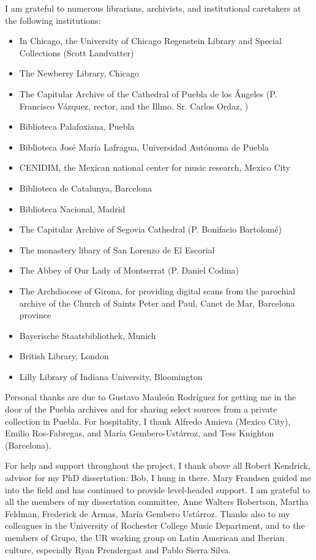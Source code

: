 I am grateful to numerous librarians, archivists, and institutional
caretakers at the following institutions:
\begin{itemize}
    \item In Chicago, the University of Chicago Regenstein Library and Special
        Collections (Scott Landvatter)
    \item The Newberry Library, Chicago
    \item The Capitular Archive of the Cathedral of Puebla de los Ángeles
        (P. Francisco Vázquez, rector, and the Illmo. Sr. Carlos
        Ordaz, )
    \item Biblioteca Palafoxiana, Puebla
    \item Biblioteca José María Lafragua, Universidad Autónoma de Puebla
    \item CENIDIM, the Mexican national center for music research, Mexico
        City
    \item Biblioteca de Catalunya, Barcelona
    \item Biblioteca Nacional, Madrid
    \item The Capitular Archive of Segovia Cathedral (P. Bonifacio Bartolomé)
    \item The monastery libary of San Lorenzo de El Escorial
    \item The Abbey of Our Lady of Montserrat (P. Daniel Codina)
    \item The Archdiocese of Girona, for providing digital scans from the
        parochial archive of the Church of Saints Peter and Paul, Canet de
        Mar, Barcelona province
    \item Bayerische Staatsbibliothek, Munich
    \item British Library, London
    \item Lilly Library of Indiana University, Bloomington
\end{itemize}
Personal thanks are due to Gustavo Mauleón Rodríguez for getting me in the
door of the Puebla archives and for sharing select sources from a private
collection in Puebla.
For hospitality, I thank Alfredo Amieva (Mexico City), Emilio Ros-Fabregas,
and María Gembero-Ustárroz, and Tess Knighton (Barcelona).

For help and support throughout the project, I thank above all Robert Kendrick,
advisor for my PhD dissertation: Bob, I hung in there. 
Mary Frandsen guided me into the field and has continued to provide
level-headed support.
I am grateful to all the members of my dissertation committee, Anne Walters
Robertson, Martha Feldman, Frederick de Armas, María Gembero Ustárroz.
Thanks also to my colleagues in the University of Rochester College Music
Department, and to the members of Grupo, the UR working group on Latin
American and Iberian culture, especially Ryan Prendergast and Pablo Sierra
Silva.

